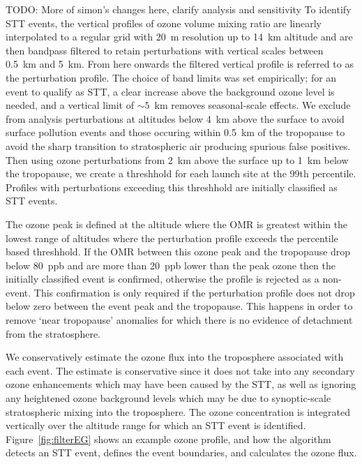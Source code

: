 \documentclass{article}
\begin{document}
    TODO: More of simon's changes here, clarify analysis and sensitivity
    To identify STT events, the vertical profiles of ozone volume mixing ratio are linearly interpolated to a regular grid with 20~m resolution up to 14~km altitude and are then bandpass filtered to retain perturbations with vertical scales between 0.5~km and 5~km.
    From here onwards the filtered vertical profile is referred to as the perturbation profile.
    The choice of band limits was set empirically; for an event to qualify as STT, a clear increase above the background ozone level is needed, and a vertical limit of $\sim 5$~km removes seasonal-scale effects.
    We exclude from analysis perturbations at altitudes below 4~km above the surface to avoid surface pollution events and those occuring within 0.5~km of the tropopause to avoid the sharp transition to stratospheric air producing spurious false positives.
    Then using ozone perturbations from 2~km above the surface up to 1~km below the tropopause, we create a threshhold for each launch site at the 99th percentile.
    Profiles with perturbations exceeding this threshhold are initially classified as STT events.
    
    The ozone peak is defined at the altitude where the OMR is greatest within the lowest range of altitudes where the perturbation profile exceeds the percentile based threshhold.
    If the OMR between this ozone peak and the tropopause drop below 80~ppb and are more than 20~ppb lower than the peak ozone then the initially classified event is confirmed, otherwise the profile is rejected as a non-event.
    This confirmation is only required if the perturbation profile does not drop below zero between the event peak and the tropopause.
    This happens in order to remove `near tropopause' anomalies for which there is no evidence of detachment from the stratosphere.

    We conservatively estimate the ozone flux into the troposphere associated with each event.
    The estimate is conservative since it does not take into any secondary ozone enhancements which may have been caused by the STT, as well as ignoring any heightened ozone background levels which may be due to synoptic-scale stratospheric mixing into the troposphere.
    The ozone concentration is integrated vertically over the altitude range for which an STT event is identified.
    Figure~\ref{fig:filterEG} shows an example ozone profile, and how the algorithm detects an STT event, defines the event boundaries, and calculates the ozone flux.
    
\end{document}
